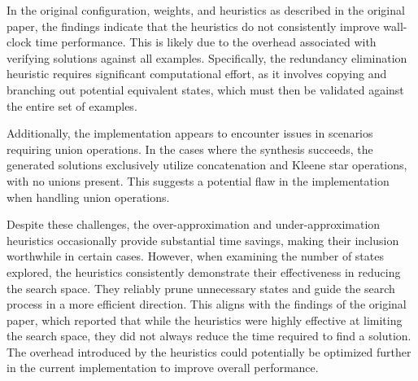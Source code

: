 \indent\indent In the original configuration, weights, and heuristics as described in the original paper, the findings indicate that the heuristics do not consistently improve wall-clock time performance. This is likely due to the overhead associated with verifying solutions against all examples. Specifically, the redundancy elimination heuristic requires significant computational effort, as it involves copying and branching out potential equivalent states, which must then be validated against the entire set of examples. 

\indent\indent Additionally, the implementation appears to encounter issues in scenarios requiring union operations. In the cases where the synthesis succeeds, the generated solutions exclusively utilize concatenation and Kleene star operations, with no unions present. This suggests a potential flaw in the implementation when handling union operations.

\indent\indent Despite these challenges, the over-approximation and under-approximation heuristics occasionally provide substantial time savings, making their inclusion worthwhile in certain cases. However, when examining the number of states explored, the heuristics consistently demonstrate their effectiveness in reducing the search space. They reliably prune unnecessary states and guide the search process in a more efficient direction. This aligns with the findings of the original paper, which reported that while the heuristics were highly effective at limiting the search space, they did not always reduce the time required to find a solution. The overhead introduced by the heuristics could potentially be optimized further in the current implementation to improve overall performance.

